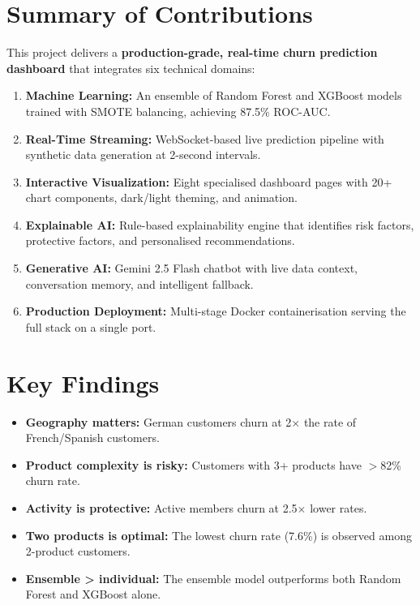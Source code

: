 \documentclass[12pt, a4paper]{report}
\begin{document}
\section{Summary of Contributions}

This project delivers a \textbf{production-grade, real-time churn prediction dashboard} that integrates six technical domains:

\begin{enumerate}
    \item \textbf{Machine Learning:} An ensemble of Random Forest and XGBoost models trained with SMOTE balancing, achieving 87.5\% ROC-AUC.
    \item \textbf{Real-Time Streaming:} WebSocket-based live prediction pipeline with synthetic data generation at 2-second intervals.
    \item \textbf{Interactive Visualization:} Eight specialised dashboard pages with 20+ chart components, dark/light theming, and animation.
    \item \textbf{Explainable AI:} Rule-based explainability engine that identifies risk factors, protective factors, and personalised recommendations.
    \item \textbf{Generative AI:} Gemini 2.5 Flash chatbot with live data context, conversation memory, and intelligent fallback.
    \item \textbf{Production Deployment:} Multi-stage Docker containerisation serving the full stack on a single port.
\end{enumerate}

\section{Key Findings}

\begin{itemize}
    \item \textbf{Geography matters:} German customers churn at 2$\times$ the rate of French/Spanish customers.
    \item \textbf{Product complexity is risky:} Customers with 3+ products have $>$82\% churn rate.
    \item \textbf{Activity is protective:} Active members churn at 2.5$\times$ lower rates.
    \item \textbf{Two products is optimal:} The lowest churn rate (7.6\%) is observed among 2-product customers.
    \item \textbf{Ensemble > individual:} The ensemble model outperforms both Random Forest and XGBoost alone.
\end{itemize}
\end{document}
